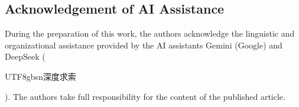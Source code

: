 \documentclass[10pt,reqno,letterpaper,twoside]{amsart}
\theoremstyle{article}
\begin{document}
  
  
  \subsection*{Acknowledgement of AI Assistance}
  During the preparation of this work,
  the authors acknowledge the linguistic and organizational assistance provided by the AI assistants Gemini (Google) and DeepSeek (\begin{CJK}{UTF8}{gbsn}深度求索\end{CJK}).
  The authors take full responsibility for the content of the published article.
  
  
\end{document}
